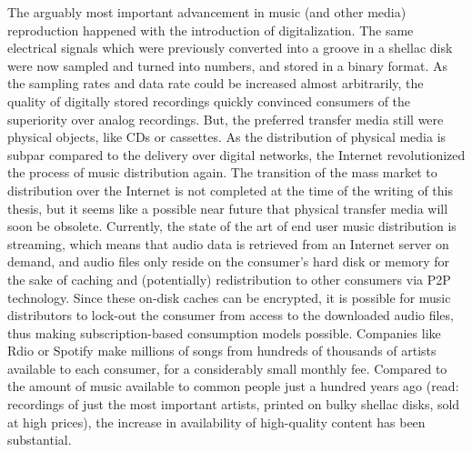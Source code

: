 The arguably most important advancement in music (and other media) reproduction happened with the introduction of digitalization. The same electrical signals which were previously converted into a groove in a shellac disk were now sampled and turned into numbers, and stored in a binary format. As the sampling rates and data rate could be increased almost arbitrarily, the quality of digitally stored recordings quickly convinced consumers of the superiority over analog recordings. But, the preferred transfer media still were physical objects, like CDs or cassettes. As the distribution of physical media is subpar compared to the delivery over digital networks, the Internet revolutionized the process of music distribution again. The transition of the mass market to distribution over the Internet is not completed at the time of the writing of this thesis, but it seems like a possible near future that physical transfer media will soon be obsolete. Currently, the state of the art of end user music distribution is streaming, which means that audio data is retrieved from an Internet server on demand, and audio files only reside on the consumer's hard disk or memory for the sake of caching and (potentially) redistribution to other consumers via P2P technology. Since these on-disk caches can be encrypted, it is possible for music distributors to lock-out the consumer from access to the downloaded audio files, thus making subscription-based consumption models possible. Companies like Rdio or Spotify make millions of songs from hundreds of thousands of artists available to each consumer, for a considerably small monthly fee. Compared to the amount of music available to common people just a hundred years ago (read: recordings of just the most important artists, printed on bulky shellac disks, sold at high prices), the increase in availability of high-quality content has been substantial.

